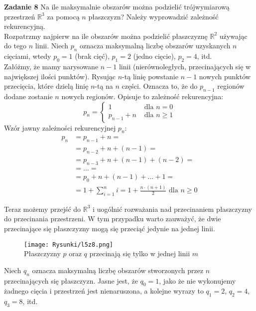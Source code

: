 \documentclass[a4paper,12pt]{article}
\begin{document}
\newpage
\noindent \textbf{Zadanie 8} \newline
Na ile maksymalnie obszarów można podzielić trójwymiarową przestrzeń $\mathbb{R}^3$ za pomocą $n$ płaszczyzn? Należy wyprowadzić zależność rekurencyjną.\\

\noindent Rozpatrzmy najpierw na ile obszarów można podzielić płaszczyznę $\mathbb{R}^2$ używając do tego $n$ linii. Niech $p_n$ oznacza maksymalną liczbę obszarów uzyskanych $n$ cięciami, wtedy $p_0 = 1$ (brak cięć), $p_1 = 2$ (jedno cięcie), $p_2 = 4$, itd. \\

\noindent Załóżmy, że mamy narysowane $n - 1$ linii (nierównoległych, przecinających się w największej ilości punktów). Rysując $n$-tą linię powstanie $n - 1$ nowych punktów przecięcia, które dzielą linię $n$-tą na $n$ części. Oznacza to, że do $p_{n-1}$ regionów dodane zostanie $n$ nowych regionów. Opisuje to zależność rekurencyjna:
\[ 
p_n =
\begin{cases}
1 			&\text{ dla } n = 0 \\
p_{n-1} + n &\text{ dla } n \geq 1
\end{cases}
\]
Wzór jawny zależności rekurencyjnej $p_n$:
\begin{align*}
	p_n &= p_{n-1} + n = \\
		&= p_{n-2} + n + (n - 1) = \\
		&= p_{n-3} + n + (n - 1) + (n - 2) = \\
		&= \ldots = \\
		&= p_0 + n + (n - 1) + \ldots + 1 = \\
		&= 1 + \sum\limits_{i = 1}^{n} i = 1 + \frac{n\cdot (n + 1)}{2} \text{ dla } n \geq 0
\end{align*}

\noindent Teraz możemy przejść do $\mathbb{R}^3$ i uogólnić rozważania nad przecinaniem płaszczyzny do przecinania przestrzeni. W tym przypadku warto zauważyć, że dwie przecinające się płaszczyzny mogą się przeciąć jedynie na jednej linii.
\begin{figure}[H]
	\centering
	\texttt{[image: Rysunki/l5z8.png]}
	\\ Płaszczyzny $p$ oraz $q$ przecinają się tylko w jednej linii $m$
\end{figure}

\noindent Niech $q_n$ oznacza maksymalną liczbę obszarów stworzonych przez $n$ przecinających się płaszczyzn. Jasne jest, że $q_0 = 1$, jako że nie wykonujemy żadnego cięcia i przestrzeń jest nienaruszona, a kolejne wyrazy to $q_1 = 2$, $q_2 = 4$, $q_3 = 8$, itd. \\ 
\end{document}
